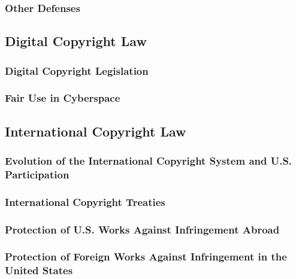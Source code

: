 \subsubsection{Other Defenses}


\subsection{Digital Copyright Law}

\subsubsection{Digital Copyright Legislation}


\subsubsection{Fair Use in Cyberspace}


\subsection{International Copyright Law}

\subsubsection{Evolution of the International Copyright System and U.S. 
Participation}


\subsubsection{International Copyright Treaties}


\subsubsection{Protection of U.S. Works Against Infringement Abroad}


\subsubsection{Protection of Foreign Works Against Infringement in the United 
States}


